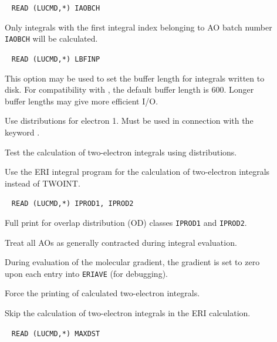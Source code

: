 \begin{description}
\item[]\verb| |\newline
\verb|READ (LUCMD,*) IAOBCH| 

Only integrals with the first integral index belonging to AO batch
number \verb|IAOBCH| will be calculated.

\item[]\verb| |\newline
\verb|READ (LUCMD,*) LBFINP|

This option may be used to set the buffer length for integrals written
to disk. For compatibility with {\twoint}, the default buffer length
is 600. Longer buffer lengths may give more efficient I/O.

\item[] Use distributions for electron 1. Must be used in
  connection with the keyword .

\item[] Test the calculation of two-electron integrals
  using distributions.

\item[] Use the ERI integral program for the calculation
  of two-electron integrals instead of TWOINT.

\item[]\verb| |\newline
\verb|READ (LUCMD,*) IPROD1, IPROD2|

Full print for overlap distribution (OD) classes \verb|IPROD1| and \verb|IPROD2|.

\item[] Treat all AOs as generally contracted during
integral evaluation.

\item[] During evaluation of the molecular gradient, the
gradient is set to zero upon each entry into \verb|ERIAVE| (for
debugging).

\item[] Force the printing of calculated two-electron integrals.

\item[] Skip the calculation of two-electron integrals in
  the ERI calculation.

\item[]\verb| |\newline
\verb|READ (LUCMD,*) MAXDST|  


\end{description}
